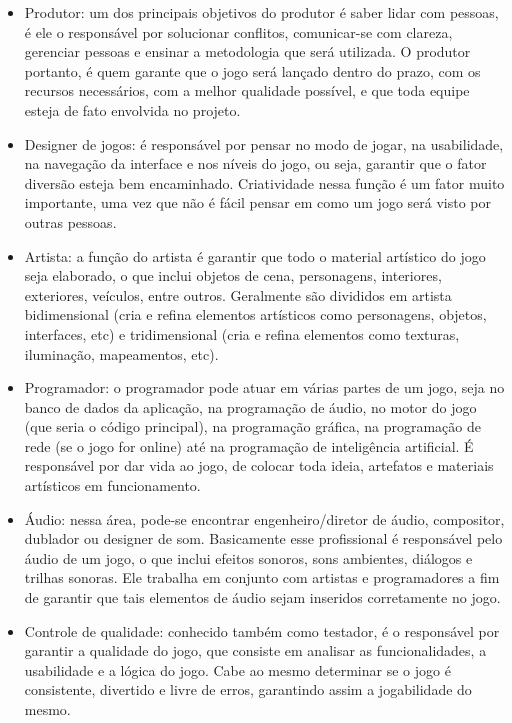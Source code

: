 \documentclass[quali]{ppgccufscar}
\begin{document}
\begin{itemize}
	\item Produtor: um dos principais objetivos do produtor é saber lidar com pessoas, é ele o responsável por solucionar conflitos, comunicar-se com clareza, gerenciar pessoas e ensinar a metodologia que será utilizada. O produtor portanto, é quem garante que o jogo será lançado dentro do prazo, com os recursos necessários, com a melhor qualidade possível, e que toda equipe esteja de fato envolvida no projeto. 
	\item Designer de jogos: é responsável por pensar no modo de jogar, na usabilidade, na navegação da interface e nos níveis do jogo, ou seja, garantir que o fator diversão esteja bem encaminhado. Criatividade nessa função é um fator muito importante, uma vez que não é fácil pensar em como um jogo será visto por outras pessoas.
	\item Artista: a função do artista é garantir que todo o material artístico do jogo seja elaborado, o que inclui objetos de cena, personagens, interiores, exteriores, veículos, entre outros. Geralmente são divididos em artista bidimensional (cria e refina elementos artísticos como personagens, objetos, interfaces, etc) e tridimensional (cria e refina elementos como texturas, iluminação, mapeamentos, etc). 
	\item Programador: o programador pode atuar em várias partes de um jogo, seja no banco de dados da aplicação, na programação de áudio, no motor do jogo (que seria o código principal), na programação gráfica, na programação de rede (se o jogo for online) até na programação de inteligência artificial. É responsável por dar vida ao jogo, de colocar toda ideia, artefatos e materiais artísticos em funcionamento.
	\item Áudio: nessa área, pode-se encontrar engenheiro/diretor de áudio, compositor, dublador ou designer de som. Basicamente esse profissional é responsável pelo áudio de um jogo, o que inclui efeitos sonoros, sons ambientes, diálogos e trilhas sonoras. Ele trabalha em conjunto com artistas e programadores a fim de garantir que tais elementos de áudio sejam inseridos corretamente no jogo.
	\item Controle de qualidade: conhecido também como testador, é o responsável por garantir a qualidade do jogo, que consiste em analisar as funcionalidades, a usabilidade e a lógica do jogo. Cabe ao mesmo determinar se o jogo é consistente, divertido e livre de erros, garantindo assim a jogabilidade do mesmo.
\end{itemize}
\end{document}
